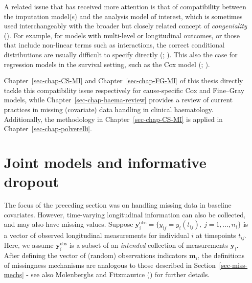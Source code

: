 \documentclass[
  letterpaper,
  DIV=11,
  numbers=noendperiod]{scrreprt}
\begin{document}
A related issue that has received more attention is that of
compatibility between the imputation model(s) and the analysis model of
interest, which is sometimes used interchangeably with the broader but
closely related concept of \emph{congeniality}
(). For example, for models with multi-level or longitudinal
outcomes, or those that include non-linear terms such as interactions,
the correct conditional distributions are usually difficult to specify
directly (;
). This also the case for regression models in the survival
setting, such as the Cox model
(;
).

Chapter~\ref{sec-chap-CS-MI} and Chapter~\ref{sec-chap-FG-MI} of this
thesis directly tackle this compatibility issue respectively for
cause-specific Cox and Fine--Gray models, while
Chapter~\ref{sec-chap-haema-review} provides a review of current
practices in missing (covariate) data handling in clinical haematology.
Additionally, the methodology in Chapter~\ref{sec-chap-CS-MI} is applied
in Chapter~\ref{sec-chap-polverelli}.

\section{Joint models and informative dropout}\label{sec-intro-jms}

The focus of the preceding section was on handling missing data in
baseline covariates. However, time-varying longitudinal information can
also be collected, and may also have missing values. Suppose
\(\mathbf{y}_{i}^{\text{obs}} = \{y_{ij} = y_i(t_{ij}), \ j = 1,\ldots,n_i\}\)
is a vector of observed longitudinal measurements for individual \(i\)
at timepoints \(t_{ij}\). Here, we assume
\(\mathbf{y}_{i}^{\text{obs}}\) is a subset of an \emph{intended}
collection of measurements \(\mathbf{y}_{i}\). After defining the vector
of (random) observations indicators \(\mathbf{m}_{i}\), the definitions
of missingness mechanisms are analogous to those described in
Section~\ref{sec-miss-mechs} - see also Molenberghs and Fitzmaurice
() for
further details.
\end{document}
